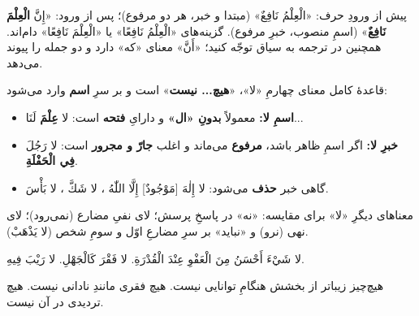 \begin{JDam}
پیش از ورودِ حرف: «الْعِلْمُ نَافِعٌ» (مبتدا و خبر، هر دو مرفوع)؛ پس از ورود:
«إِنَّ \textbf{الْعِلْمَ} \textbf{نَافِعٌ}» (اسمِ منصوب، خبرِ مرفوع). گزینه‌های
«الْعِلْمُ نَافِعًا» یا «الْعِلْمَ نَافِعًا» دام‌اند. همچنین در ترجمه به سیاق
توجّه کنید؛ «أَنَّ» معنای «که» دارد و دو جمله را پیوند می‌دهد.
\end{JDam}


\begin{JQaede}{قاعدهٔ کامل}
معنای چهارمِ «لا»، «\textbf{هیچ... نیست}» است و بر سرِ \textbf{اسم} وارد
می‌شود:
\begin{itemize}
  \item \textbf{اسمِ لا:} معمولاً \textbf{بدونِ «ال»} و دارایِ \textbf{فتحه}
        است: لا \textbf{عِلْمَ} لَنَا...
  \item \textbf{خبرِ لا:} اگر اسمِ ظاهر باشد، \textbf{مرفوع} می‌ماند و اغلب
        \textbf{جارّ و مجرور} است: لا رَجُلَ \textbf{فِي الْحَفْلَةِ}.
  \item گاهی خبر \textbf{حذف} می‌شود: لا إِلٰهَ [مَوْجُودٌ] إِلَّا اللّٰهُ ،
        لا شَكَّ ، لا بَأْسَ.
\end{itemize}
معناهای دیگرِ «لا» برای مقایسه: «نه» در پاسخِ پرسش؛ لای نفیِ مضارع (نمی‌رود)؛
لای نهی (نرو) و «نباید» بر سرِ مضارعِ اوّل و سومِ شخص (لا يَذْهَبْ).
\end{JQaede}

\begin{JHadith}
\Ar لا شَيْءَ أَحْسَنُ مِنَ الْعَفْوِ عِنْدَ الْقُدْرَةِ.\quad
\Ar لا فَقْرَ كَالْجَهْلِ.\quad
\Ar لا رَيْبَ فِيهِ.

هیچ‌چیز زیباتر از بخشش هنگامِ توانایی نیست. هیچ فقری مانندِ نادانی نیست. هیچ
تردیدی در آن نیست.
\end{JHadith}


